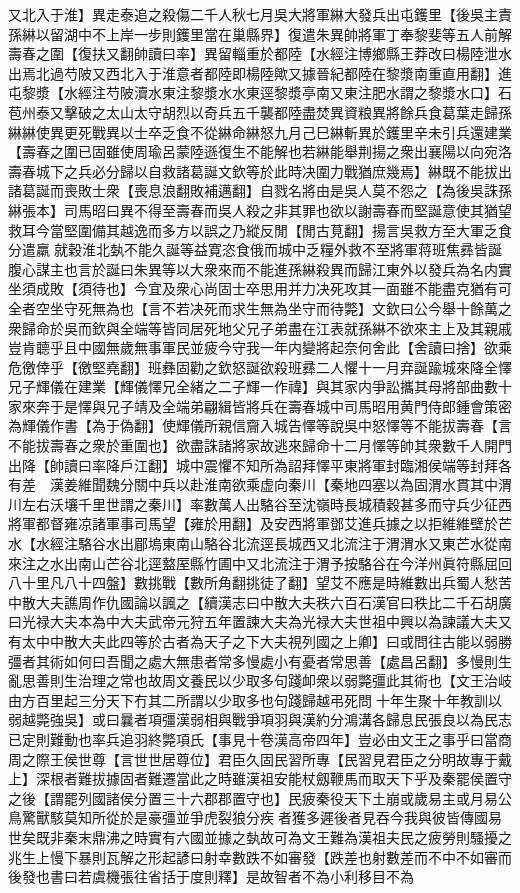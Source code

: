 又北入于淮】異走泰追之殺傷二千人秋七月吳大將軍綝大發兵出屯鑊里【後吳主責孫綝以留湖中不上岸一步則鑊里當在巢縣界】復遣朱異帥將軍丁奉黎斐等五人前解壽春之圍【復扶又翻帥讀曰率】異留輜重於都陸【水經注博鄉縣王莽改曰楊陸泄水出焉北過芍陂又西北入于淮意者都陸即楊陸歟又據晉紀都陸在黎漿南重直用翻】進屯黎漿【水經注芍陂瀆水東注黎漿水水東逕黎漿亭南又東注肥水謂之黎漿水口】石苞州泰又擊破之太山太守胡烈以奇兵五千襲都陸盡焚異資粮異將餘兵食葛葉走歸孫綝綝使異更死戰異以士卒乏食不從綝命綝怒九月己巳綝斬異於鑊里辛未引兵還建業【壽春之圍已固雖使周瑜呂蒙陸遜復生不能解也若綝能舉荆揚之衆出襄陽以向宛洛壽春城下之兵必分歸以自救諸葛誕文欽等於此時决圍力戰猶庶幾焉】綝既不能拔出諸葛誕而喪敗士衆【喪息浪翻敗補邁翻】自戮名將由是吳人莫不怨之【為後吳誅孫綝張本】司馬昭曰異不得至壽春而吳人殺之非其罪也欲以謝壽春而堅誕意使其猶望救耳今當堅圍備其越逸而多方以誤之乃縱反閒【閒古莧翻】揚言吳救方至大軍乏食分遣羸就穀淮北埶不能久誕等益寛恣食俄而城中乏糧外救不至將軍蒋班焦彞皆誕腹心謀主也言於誕曰朱異等以大衆來而不能進孫綝殺異而歸江東外以發兵為名内實坐須成敗【須待也】今宜及衆心尚固士卒思用并力决死攻其一面雖不能盡克猶有可全者空坐守死無為也【言不若决死而求生無為坐守而待斃】文欽曰公今舉十餘萬之衆歸命於吳而欽與全端等皆同居死地父兄子弟盡在江表就孫綝不欲來主上及其親戚豈肯聼乎且中國無歲無事軍民並疲今守我一年内變將起奈何舍此【舍讀曰捨】欲乘危徼倖乎【徼堅堯翻】班彝固勸之欽怒誕欲殺班彞二人懼十一月弃誕踰城來降全懌兄子輝儀在建業【輝儀懌兄全緒之二子輝一作禕】與其家内爭訟攜其母將部曲數十家來奔于是懌與兄子靖及全端弟翩緝皆將兵在壽春城中司馬昭用黄門侍郎鍾會策密為輝儀作書【為于偽翻】使輝儀所親信齎入城告懌等說吳中怒懌等不能拔壽春【言不能拔壽春之衆於重圍也】欲盡誅諸將家故逃來歸命十二月懌等帥其衆數千人開門出降【帥讀曰率降戶江翻】城中震懼不知所為詔拜懌平東將軍封臨湘侯端等封拜各有差　漢姜維聞魏分關中兵以赴淮南欲乘虚向秦川【秦地四塞以為固渭水貫其中渭川左右沃壤千里世謂之秦川】率數萬人出駱谷至沈嶺時長城積穀甚多而守兵少征西將軍都督雍凉諸軍事司馬望【雍於用翻】及安西將軍鄧艾進兵據之以拒維維壁於芒水【水經注駱谷水出郿塢東南山駱谷北流逕長城西又北流注于渭渭水又東芒水從南來注之水出南山芒谷北逕盩厔縣竹圃中又北流注于渭予按駱谷在今洋州眞符縣屈回八十里凡八十四盤】數挑戰【數所角翻挑徒了翻】望艾不應是時維數出兵蜀人愁苦中散大夫譙周作仇國論以諷之【續漢志曰中散大夫秩六百石漢官曰秩比二千石胡廣曰光禄大夫本為中大夫武帝元狩五年置諫大夫為光禄大夫世祖中興以為諫議大夫又有太中中散大夫此四等於古者為天子之下大夫視列國之上卿】曰或問往古能以弱勝彊者其術如何曰吾聞之處大無患者常多慢處小有憂者常思善【處昌呂翻】多慢則生亂思善則生治理之常也故周文養民以少取多句踐卹衆以弱斃彊此其術也【文王治岐由方百里起三分天下冇其二所謂以少取多也句踐歸越弔死問十年生聚十年教訓以弱越斃強吳】或曰曩者項彊漢弱相與戰爭項羽與漢約分鴻溝各歸息民張良以為民志已定則難動也率兵追羽終斃項氏【事見十卷漢高帝四年】豈必由文王之事乎曰當商周之際王侯世尊【言世世居尊位】君臣久固民習所專【民習見君臣之分明故專于戴上】深根者難拔據固者難遷當此之時雖漢祖安能杖劔鞭馬而取天下乎及秦罷侯置守之後【謂罷列國諸侯分置三十六郡郡置守也】民疲秦役天下土崩或歲易主或月易公鳥驚獸駭莫知所從於是豪彊並爭虎裂狼分疾者獲多遲後者見吞今我與彼皆傳國易世矣既非秦末鼎沸之時實有六國並據之埶故可為文王難為漢祖夫民之疲勞則騷擾之兆生上慢下暴則瓦解之形起諺曰射幸數跌不如審發【跌差也射數差而不中不如審而後發也書曰若虞機張往省括于度則釋】是故智者不為小利移目不為